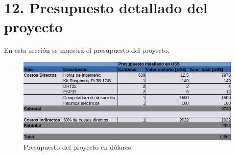 \documentclass[
11pt, %
]{charter}
\begin{document}
\section{12. Presupuesto detallado del proyecto}
\label{sec:presupuesto}
En esta sección se muestra el presupuesto del proyecto.

\begin{figure}[htpb]
\centering 
\includegraphics[width=1.0\textwidth]{./Figuras/presupuesto.png}
\caption{Presupuesto del proyecto en dólares.}
\label{fig:AoN}
\end{figure}
\end{document}
